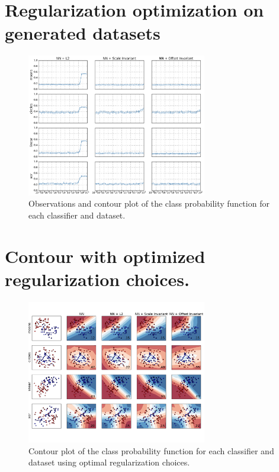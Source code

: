 
\onecolumn
\section{Regularization optimization on generated datasets}
\label{appendix:regualization-optimization}
\begin{figure}[H]
	\centering
	\includegraphics[width=0.7\textwidth]{plots/syntetic_reg_opt}
	\caption{Observations and contour plot of the class probability function for each classifier and dataset.}
\end{figure}

\section{Contour with optimized regularization choices.}
\label{appendix:generated-contour-optimized}
\begin{figure}[H]
	\centering
	\includegraphics[width=0.7\textwidth, trim = 0 2.2cm 0 1.5cm, clip]{plots/2d_classifier-optimized}
	\caption{Contour plot of the class probability function for each classifier and dataset using optimal regularization choices.}
\end{figure}

